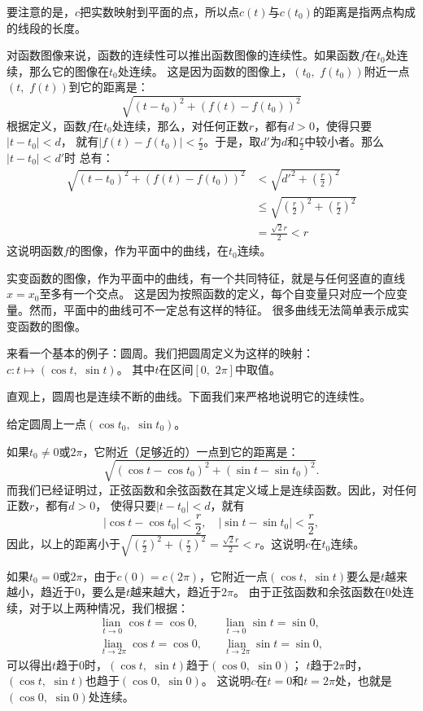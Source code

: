 \documentclass[12pt,UTF8]{ctexbook}
\newcommand\lian[1]{
    \underset{#1}{\operatorname{lian}\,}
}
\begin{document}
要注意的是，$c$把实数映射到平面的点，所以点$c(t)$与$c(t_0)$的距离是指两点构成的线段的长度。

对函数图像来说，函数的连续性可以推出函数图像的连续性。如果函数$f$在$t_0$处连续，那么它的图像在$t_0$处连续。
这是因为函数的图像上，$(t_0,\,\, f(t_0))$附近一点$(t,\,\, f(t))$到它的距离是：
$$ \sqrt{(t - t_0)^2 + (f(t) - f(t_0))^2} $$
根据定义，函数$f$在$t_0$处连续，那么，对任何正数$r$，都有$d>0$，使得只要$|t - t_0| < d$，
就有$|f(t) - f(t_0)| < \frac{r}{2}$。于是，取$d'$为$d$和$\frac{r}{2}$中较小者。那么$|t - t_0| < d'$时
总有：
\begin{align*}
    \sqrt{(t - t_0)^2 + (f(t) - f(t_0))^2} &< \sqrt{d'^2 + \left(\frac{r}{2}\right)^2}  \\
    &\leqslant \sqrt{\left(\frac{r}{2}\right)^2 + \left(\frac{r}{2}\right)^2}  \\
    &= \frac{\sqrt{2}r}{2} < r 
\end{align*}
这说明函数$f$的图像，作为平面中的曲线，在$t_0$连续。

实变函数的图像，作为平面中的曲线，有一个共同特征，就是与任何竖直的直线$x = x_0$至多有一个交点。
这是因为按照函数的定义，每个自变量只对应一个应变量。然而，平面中的曲线可不一定总有这样的特征。
很多曲线无法简单表示成实变函数的图像。

来看一个基本的例子：圆周。我们把圆周定义为这样的映射：$c: t\mapsto (\cos{t}, \,\, \sin{t})$。
其中$t$在区间$[0, \,\,2\pi]$中取值。

直观上，圆周也是连续不断的曲线。下面我们来严格地说明它的连续性。

给定圆周上一点$(\cos{t_0}, \,\, \sin{t_0})$。

如果$t_0 \neq 0$或$2\pi$，它附近（足够近的）一点到它的距离是：
$$ \sqrt{(\cos{t} - \cos{t_0})^2 + (\sin{t} - \sin{t_0})^2}. $$
而我们已经证明过，正弦函数和余弦函数在其定义域上是连续函数。因此，对任何正数$r$，都有$d>0$，
使得只要$|t - t_0| < d$，就有
$$ |\cos{t} - \cos{t_0}| < \frac{r}{2}, \quad |\sin{t} - \sin{t_0}| < \frac{r}{2}, $$
因此，以上的距离小于$\sqrt{\left(\frac{r}{2}\right)^2 + \left(\frac{r}{2}\right)^2} = \frac{\sqrt{2}r}{2} < r$。这说明$c$在$t_0$连续。

如果$t_0 = 0$或$2\pi$，由于$c(0) = c(2\pi)$，它附近一点$(\cos{t}, \,\, \sin{t})$要么是$t$越来越小，趋近于$0$，要么是$t$越来越大，趋近于$2\pi$。
由于正弦函数和余弦函数在$0$处连续，对于以上两种情况，我们根据：
\begin{align*}
    \lian{t \to 0} \cos{t} = \cos{0}, \quad &\lian{t \to 0} \sin{t} = \sin{0},  \\
    \lian{t \to 2\pi} \cos{t} = \cos{0}, \quad &\lian{t \to 2\pi} \sin{t} = \sin{0},  
\end{align*}
可以得出$t$趋于$0$时，$(\cos{t}, \,\, \sin{t})$趋于$(\cos{0}, \,\, \sin{0})$；
$t$趋于$2\pi$时，$(\cos{t}, \,\, \sin{t})$也趋于$(\cos{0}, \,\, \sin{0})$。
这说明$c$在$t=0$和$t=2\pi$处，也就是$(\cos{0}, \,\, \sin{0})$处连续。
\end{document}
